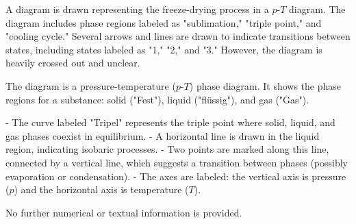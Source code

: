 A diagram is drawn representing the freeze-drying process in a \( p \)-\( T \) diagram. The diagram includes phase regions labeled as "sublimation," "triple point," and "cooling cycle." Several arrows and lines are drawn to indicate transitions between states, including states labeled as "1," "2," and "3." However, the diagram is heavily crossed out and unclear.

The diagram is a pressure-temperature (\( p \)-\( T \)) phase diagram. It shows the phase regions for a substance: solid ("Fest"), liquid ("flüssig"), and gas ("Gas").  

- The curve labeled "Tripel" represents the triple point where solid, liquid, and gas phases coexist in equilibrium.  
- A horizontal line is drawn in the liquid region, indicating isobaric processes.  
- Two points are marked along this line, connected by a vertical line, which suggests a transition between phases (possibly evaporation or condensation).  
- The axes are labeled: the vertical axis is pressure (\( p \)) and the horizontal axis is temperature (\( T \)).  

No further numerical or textual information is provided.